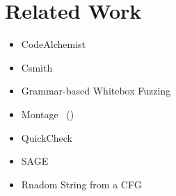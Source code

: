 \section{Related Work}\label{sec:related}

\begin{itemize}
  \item CodeAlchemist~\cite{codealchemist}
  \item Csmith~\cite{csmith}
  \item Grammar-based Whitebox Fuzzing~\cite{grammar-whitebox}
  \item Montage~\cite{montage} ()
  \item QuickCheck~\cite{quickcheck}
  \item SAGE~\cite{sage}
  \item Rnadom String from a CFG~\cite{cfg-gen}
\end{itemize}
